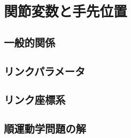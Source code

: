 \documentclass{article}
\begin{document}
\section{関節変数と手先位置}
\subsection{一般的関係}
\subsection{リンクパラメータ}
\subsection{リンク座標系}
\subsection{順運動学問題の解}


　
\end{document}
